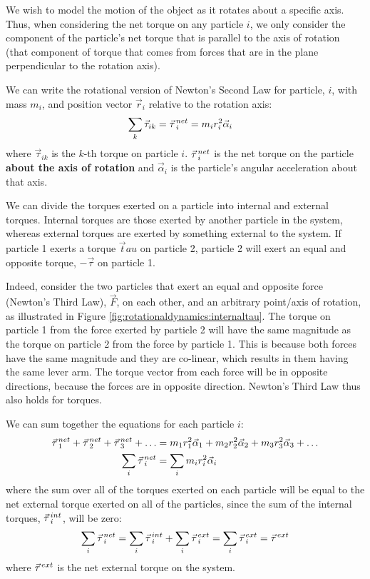 We wish to model the motion of the object as it rotates about a specific axis. Thus, when considering the net torque on any particle $i$, we only consider the component of the particle's net torque that is parallel to the axis of rotation (that component of torque that comes from forces that are in the plane perpendicular to the rotation axis).

We can write the rotational version of Newton's Second Law for particle, $i$, with mass $m_i$, and position vector $\vec r_i$ relative to the rotation axis:
\begin{align*}
\sum_k \vec\tau_{ik} = \pvec\tau_i^{net} &= m_ir_i^2\vec\alpha_i
\end{align*}
where $\vec\tau_{ik}$ is the $k$-th torque on particle $i$. $\pvec\tau_i^{net}$ is the net torque on the particle \textbf{about the axis of rotation} and $\vec\alpha_i$ is the particle's angular acceleration about that axis.

We can divide the torques exerted on a particle into internal and external torques. Internal torques are those exerted by another particle in the system, whereas external torques are exerted by something external to the system. If particle 1 exerts a torque $\vec tau$ on particle 2, particle 2 will exert an equal and opposite torque, $-\vec\tau$ on particle 1.

Indeed, consider the two particles that exert an equal and opposite force (Newton's Third Law), $\vec F$, on each other, and an arbitrary point/axis of rotation, as illustrated in Figure \ref{fig:rotationaldynamics:internaltau}. The torque on particle 1 from the force exerted by particle 2 will have the same magnitude as the torque on particle 2 from the force by particle 1. This is because both forces have the same magnitude and they are co-linear, which results in them having the same lever arm. The torque vector from each force will be in opposite directions, because the forces are in opposite direction. Newton's Third Law thus also holds for torques.

We can sum together the equations for each particle $i$:
\begin{align*}
\pvec\tau_1^{net} + \pvec\tau_2^{net} +\pvec\tau_3^{net} + \dots &= m_1r_1^2\vec\alpha_1 + m_2r_2^2\vec\alpha_2 +m_3r_3^2\vec\alpha_3 +\dots\\
\sum_i \pvec\tau_i^{net} &= \sum_i  m_ir_i^2\vec\alpha_i
\end{align*}
where the sum over all of the torques exerted on each particle will be equal to the net external torque exerted on all of the particles, since the sum of the internal torques, $\pvec\tau_i^{int}$, will be zero:
\begin{align*}
\sum_i \pvec\tau_i^{net} = \sum_i \pvec\tau_i^{int} + \sum_i \pvec\tau_i^{ext} = \sum_i \pvec\tau_i^{ext} = \pvec\tau^{ext}
\end{align*}
where $ \pvec\tau^{ext}$ is the net external torque on the system.

